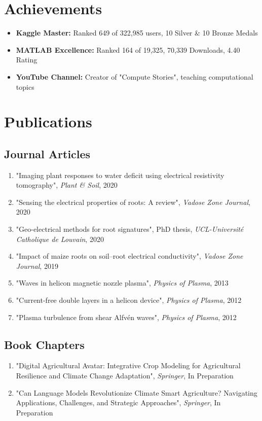 \documentclass[11pt,a4paper]{article}
\begin{document}
\section*{Achievements}
\begin{itemize}[leftmargin=*]
    \item \textbf{Kaggle Master:} Ranked 649 of 322,985 users, 10 Silver \& 10 Bronze Medals
    \item \textbf{MATLAB Excellence:} Ranked 164 of 19,325, 70,339 Downloads, 4.40 Rating
    \item \textbf{YouTube Channel:} Creator of "Compute Stories", teaching computational topics
\end{itemize}

\section*{Publications}
\subsection*{Journal Articles}
\begin{enumerate}[leftmargin=*]
    \item "Imaging plant responses to water deficit using electrical resistivity tomography", \textit{Plant \& Soil}, 2020
    \item "Sensing the electrical properties of roots: A review", \textit{Vadose Zone Journal}, 2020
    \item "Geo-electrical methods for root signatures", PhD thesis, \textit{UCL-Université Catholique de Louvain}, 2020
    \item "Impact of maize roots on soil--root electrical conductivity", \textit{Vadose Zone Journal}, 2019
    \item "Waves in helicon magnetic nozzle plasma", \textit{Physics of Plasma}, 2013
    \item "Current-free double layers in a helicon device", \textit{Physics of Plasma}, 2012
    \item "Plasma turbulence from shear Alfvén waves", \textit{Physics of Plasma}, 2012
\end{enumerate}

\subsection*{Book Chapters}
\begin{enumerate}[leftmargin=*]
    \item "Digital Agricultural Avatar: Integrative Crop Modeling for Agricultural Resilience and Climate Change Adaptation", \textit{Springer}, In Preparation
    \item "Can Language Models Revolutionize Climate Smart Agriculture? Navigating Applications, Challenges, and Strategic Approaches", \textit{Springer}, In Preparation
\end{enumerate}
\end{document}
